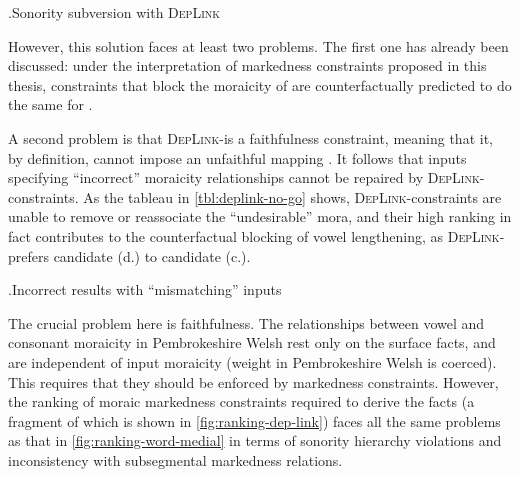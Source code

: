 \ex.Sonority subversion with \textsc{DepLink}\\

However, this solution faces at least two problems. The first one has already been discussed: under the interpretation of markedness constraints proposed in this thesis, constraints that block the moraicity of \ipa{[b~d~ɡ]} are counterfactually predicted to do the same for \ipa{[p~t~k]}.

A second problem is that \textsc{DepLink}-\mo is a faithfulness constraint, meaning that it, by definition, cannot impose an unfaithful mapping \citep{moreton2004,wolf07:_what_ot}. It follows that inputs specifying \enquote{incorrect} moraicity relationships cannot be repaired by \textsc{DepLink}-\mo constraints. As the tableau in \ref{tbl:deplink-no-go} shows, \textsc{DepLink}-\mo constraints are unable to remove or reassociate the \enquote{undesirable} mora, and their high ranking in fact contributes to the counterfactual blocking of vowel lengthening, as \textsc{DepLink}-\mo[V] prefers candidate (d.) to candidate (c.).

\ex.\label{tbl:deplink-no-go}Incorrect results with \enquote{mismatching} inputs\\

The crucial problem here is faithfulness. The relationships between vowel and consonant moraicity in Pembrokeshire Welsh rest only on the surface facts, and are independent of input moraicity (\ie weight in Pembrokeshire Welsh is coerced). This requires that they should be enforced by markedness constraints. However, the ranking of moraic markedness constraints required to derive the facts (a fragment of which is shown in \cref{fig:ranking-dep-link}) faces all the same problems as that in \cref{fig:ranking-word-medial} in terms of sonority hierarchy violations and inconsistency with subsegmental markedness relations.

